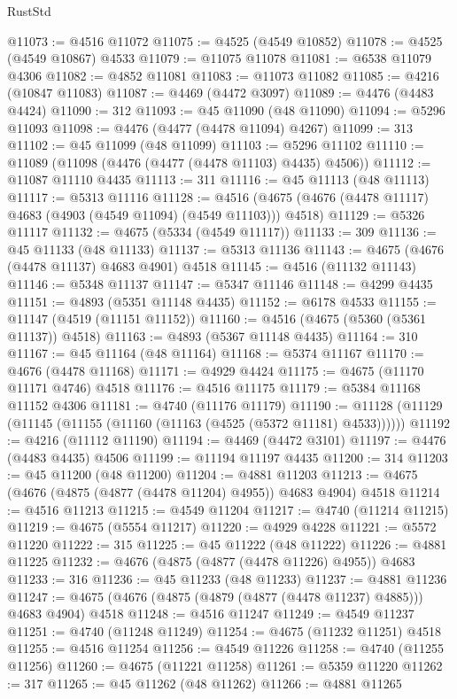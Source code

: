 \begin{lexlean}{RustStd}
\begin{coremodule}
{\begin{coremodule}
{{{{{{{{{{{{{{{{{{{{{{{{{{{{{{{{{{{{{{{{{{{{{{{{{{{{{{{{{{{{@11073 := @4516 @11072
@11075 := @4525 (@4549 @10852)
@11078 := @4525 (@4549 @10867) @4533
@11079 := @11075 @11078
@11081 := @6538 @11079 @4306
@11082 := @4852 @11081
@11083 := @11073 @11082
@11085 := @4216 (@10847 @11083)
@11087 := @4469 (@4472 @3097)
@11089 := @4476 (@4483 @4424)
@11090 := 312
@11093 := @45 @11090 (@48 @11090)
@11094 := @5296 @11093
@11098 := @4476 (@4477 (@4478 @11094) @4267)
@11099 := 313
@11102 := @45 @11099 (@48 @11099)
@11103 := @5296 @11102
@11110 := @11089 (@11098 (@4476 (@4477 (@4478 @11103) @4435) @4506))
@11112 := @11087 @11110 @4435
@11113 := 311
@11116 := @45 @11113 (@48 @11113)
@11117 := @5313 @11116
@11128 := @4516 (@4675 (@4676 (@4478 @11117) @4683 (@4903 (@4549 @11094) (@4549 @11103))) @4518)
@11129 := @5326 @11117
@11132 := @4675 (@5334 (@4549 @11117))
@11133 := 309
@11136 := @45 @11133 (@48 @11133)
@11137 := @5313 @11136
@11143 := @4675 (@4676 (@4478 @11137) @4683 @4901) @4518
@11145 := @4516 (@11132 @11143)
@11146 := @5348 @11137
@11147 := @5347 @11146
@11148 := @4299 @4435
@11151 := @4893 (@5351 @11148 @4435)
@11152 := @6178 @4533
@11155 := @11147 (@4519 (@11151 @11152))
@11160 := @4516 (@4675 (@5360 (@5361 @11137)) @4518)
@11163 := @4893 (@5367 @11148 @4435)
@11164 := 310
@11167 := @45 @11164 (@48 @11164)
@11168 := @5374 @11167
@11170 := @4676 (@4478 @11168)
@11171 := @4929 @4424
@11175 := @4675 (@11170 @11171 @4746) @4518
@11176 := @4516 @11175
@11179 := @5384 @11168 @11152 @4306
@11181 := @4740 (@11176 @11179)
@11190 := @11128 (@11129 (@11145 (@11155 (@11160 (@11163 (@4525 (@5372 @11181) @4533))))))
@11192 := @4216 (@11112 @11190)
@11194 := @4469 (@4472 @3101)
@11197 := @4476 (@4483 @4435) @4506
@11199 := @11194 @11197 @4435
@11200 := 314
@11203 := @45 @11200 (@48 @11200)
@11204 := @4881 @11203
@11213 := @4675 (@4676 (@4875 (@4877 (@4478 @11204) @4955)) @4683 @4904) @4518
@11214 := @4516 @11213
@11215 := @4549 @11204
@11217 := @4740 (@11214 @11215)
@11219 := @4675 (@5554 @11217)
@11220 := @4929 @4228
@11221 := @5572 @11220
@11222 := 315
@11225 := @45 @11222 (@48 @11222)
@11226 := @4881 @11225
@11232 := @4676 (@4875 (@4877 (@4478 @11226) @4955)) @4683
@11233 := 316
@11236 := @45 @11233 (@48 @11233)
@11237 := @4881 @11236
@11247 := @4675 (@4676 (@4875 (@4879 (@4877 (@4478 @11237) @4885))) @4683 @4904) @4518
@11248 := @4516 @11247
@11249 := @4549 @11237
@11251 := @4740 (@11248 @11249)
@11254 := @4675 (@11232 @11251) @4518
@11255 := @4516 @11254
@11256 := @4549 @11226
@11258 := @4740 (@11255 @11256)
@11260 := @4675 (@11221 @11258)
@11261 := @5359 @11220
@11262 := 317
@11265 := @45 @11262 (@48 @11262)
@11266 := @4881 @11265
}}}}}}}}}}}}}}}}}}}}}}}}}}}}}}}}}}}}}}}}}}}}}}}}}}}}}}}}}}}}
\end{coremodule}}
\end{coremodule}
\end{lexlean}

